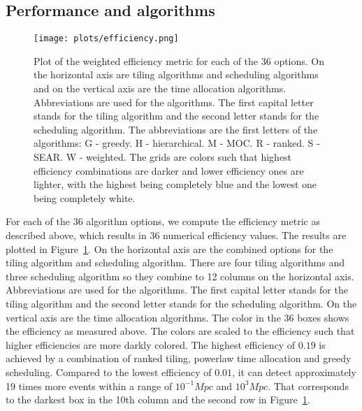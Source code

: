 \documentclass[twocolumn]{aastex62}
\begin{document}
\subsection{Performance and algorithms}
\begin{figure}[t]
\texttt{[image: plots/efficiency.png]}
\caption{Plot of the weighted efficiency metric for each of the 36 options. On the horizontal axis are tiling algorithms and scheduling algorithms and on the vertical axis are the time allocation algorithms. Abbreviations are used for the algorithms. The first capital letter stands for the tiling algorithm and the second letter stands for the scheduling algorithm. The abbreviations are the first letters of the algorithms: G - greedy. H - hierarchical. M - MOC. R - ranked. S - SEAR. W - weighted. The grids are colors such that highest efficiency combinations are darker and lower efficiency ones are lighter, with the highest being completely blue and the lowest one being completely white.}
\label{fig:eff_metric}
\centering
\end{figure}
For each of the 36 algorithm options, we compute the efficiency metric as described above, which results in 36 numerical efficiency values. The results are plotted in Figure~\ref{fig:eff_metric}. On the horizontal axis are the combined options for the tiling algorithm and scheduling algorithm. There are four tiling algorithms and three scheduling algorithm so they combine to 12 columns on the horizontal axis. Abbreviations are used for the algorithms. The first capital letter stands for the tiling algorithm and the second letter stands for the scheduling algorithm. On the vertical axis are the time allocation algorithms. The color in the 36 boxes shows the efficiency as measured above. The colors are scaled to the efficiency such that higher efficiencies are more darkly colored.
The highest efficiency of $0.19$ is achieved by a combination of ranked tiling, powerlaw time allocation and greedy scheduling. Compared to the lowest efficiency of $0.01$, it can detect approximately 19 times more events within a range of $10^{-1} Mpc$ and $10^3 Mpc$. That corresponds to the darkest box in the 10th column and the second row in Figure~\ref{fig:eff_metric}. 
\end{document}
